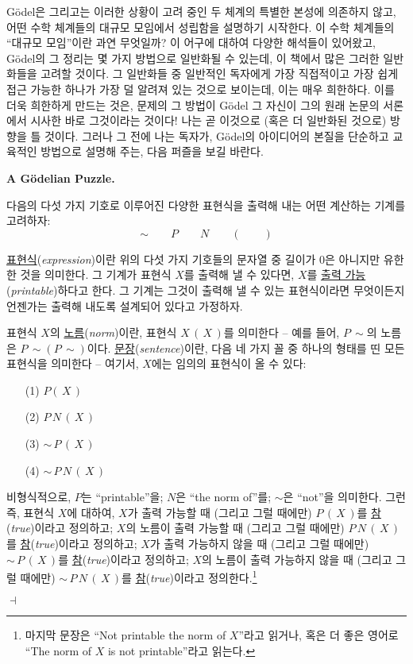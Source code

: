 \documentclass[12pt]{paper}
\newenvironment{context}[1][]
{ \noindent \textbf{{#1}.}
}
{ \hfill $ \dashv $
}
\begin{document}
  G\"odel은 그리고는 이러한 상황이 고려 중인 두 체계의 특별한 본성에 의존하지 않고,
  어떤 수학 체계들의 대규모 모임에서 성립함을 설명하기 시작한다.
  이 수학 체계들의 ``대규모 모임''이란 과연 무엇일까?
  이 어구에 대하여 다양한 해석들이 있어왔고,
  G\"odel의 그 정리는 몇 가지 방법으로 일반화될 수 있는데,
  이 책에서 많은 그러한 일반화들을 고려할 것이다.
  그 일반화들 중 일반적인 독자에게 가장 직접적이고 가장 쉽게 접근 가능한 하나가 가장 덜 알려져 있는 것으로 보이는데,
  이는 매우 희한하다.
  이를 더욱 희한하게 만드는 것은,
  문제의 그 방법이 G\"odel 그 자신이 그의 원래 논문의 서론에서 시사한 바로 그것이라는 것이다!
  나는 곧 이것으로 (혹은 더 일반화된 것으로) 방향을 틀 것이다.
  그러나 그 전에 나는 독자가,
  G\"odel의 아이디어의 본질을 단순하고 교육적인 방법으로 설명해 주는,
  다음 퍼즐을 보길 바란다.

  \begin{context}[A G\"odelian Puzzle]
    다음의 다섯 가지 기호로 이루어진 다양한 표현식을 출력해 내는 어떤 계산하는 기계를 고려하자:
    $$ \sim \qquad P \qquad N \qquad \left( \right. \qquad \left. \right) $$
    
    \underline{표현식}(\textit{expression})이란 위의 다섯 가지 기호들의 문자열 중 길이가 $0$은 아니지만 유한한 것을 의미한다.
    그 기계가 표현식 $X$를 출력해 낼 수 있다면,
    $X$를 \underline{출력 가능}(\textit{printable})하다고 한다.
    그 기계는 그것이 출력해 낼 수 있는 표현식이라면 무엇이든지 언젠가는 출력해 내도록 설계되어 있다고 가정하자.

    표현식 $X$의 \underline{노름}(\textit{norm})이란,
    표현식 $X \, \left( \, X \, \right)$를 의미한다 --
    예를 들어, $P \, \sim$의 노름은 $P \, \sim \left( P \, \sim \right)$이다.
    \underline{문장}(\textit{sentence})이란, 다음 네 가지 꼴 중 하나의 형태를 띤 모든 표현식을 의미한다 --
    여기서, $X$에는 임의의 표현식이 올 수 있다:
    \begin{itemize}
      \item[(1)] $P \left( \, X \, \right)$
      \item[(2)] $P \, N \, \left( \, X \, \right)$
      \item[(3)] $\sim \, P \, \left( \, X \, \right)$
      \item[(4)] $\sim \, P \, N \, \left( \, X \, \right)$   
    \end{itemize}

    비형식적으로, $P$는 ``printable''을; $N$은 ``the norm of''를; $\sim$은 ``not''을 의미한다.
    그런즉, 표현식 $X$에 대하여,
    $X$가 출력 가능할 때 (그리고 그럴 때에만) $P \, \left( \, X \, \right)$를 \underline{참}(\textit{true})이라고 정의하고;
    $X$의 노름이 출력 가능할 때 (그리고 그럴 때에만) $P \, N \, \left( \, X \, \right)$를 \underline{참}(\textit{true})이라고 정의하고;
    $X$가 출력 가능하지 않을 때 (그리고 그럴 때에만) $\sim \, P \, \left( \, X \, \right)$를 \underline{참}(\textit{true})이라고 정의하고;
    $X$의 노름이 출력 가능하지 않을 때 (그리고 그럴 때에만) $\sim \, P \, N \, \left( \, X \, \right)$를 \underline{참}(\textit{true})이라고 정의한다.\footnote
    {
      마지막 문장은 ``Not printable the norm of $X$''라고 읽거나,
      혹은 더 좋은 영어로 ``The norm of $X$ is not printable''라고 읽는다.
    }


\end{context}
\end{document}
